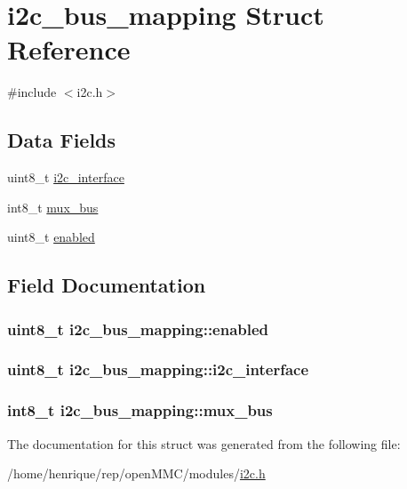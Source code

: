 \hypertarget{structi2c__bus__mapping}{\section{i2c\-\_\-bus\-\_\-mapping Struct Reference}
\label{structi2c__bus__mapping}
}


{\ttfamily \#include $<$i2c.\-h$>$}

\subsection*{Data Fields}
\begin{DoxyCompactItemize}
\item 
uint8\-\_\-t \hyperlink{structi2c__bus__mapping_ad1258325bf8a2f8cae58481ad77ed875}{i2c\-\_\-interface}
\item 
int8\-\_\-t \hyperlink{structi2c__bus__mapping_a91000fe9bd94bb2b6f5f4d75871f000e}{mux\-\_\-bus}
\item 
uint8\-\_\-t \hyperlink{structi2c__bus__mapping_a7b1cf1b2bd2f3ccacc8ad91a4c5a0f45}{enabled}
\end{DoxyCompactItemize}


\subsection{Field Documentation}
\hypertarget{structi2c__bus__mapping_a7b1cf1b2bd2f3ccacc8ad91a4c5a0f45}{
\subsubsection[{enabled}]{\setlength{\rightskip}{0pt plus 5cm}uint8\-\_\-t i2c\-\_\-bus\-\_\-mapping\-::enabled}}\label{structi2c__bus__mapping_a7b1cf1b2bd2f3ccacc8ad91a4c5a0f45}
\hypertarget{structi2c__bus__mapping_ad1258325bf8a2f8cae58481ad77ed875}{
\subsubsection[{i2c\-\_\-interface}]{\setlength{\rightskip}{0pt plus 5cm}uint8\-\_\-t i2c\-\_\-bus\-\_\-mapping\-::i2c\-\_\-interface}}\label{structi2c__bus__mapping_ad1258325bf8a2f8cae58481ad77ed875}
\hypertarget{structi2c__bus__mapping_a91000fe9bd94bb2b6f5f4d75871f000e}{
\subsubsection[{mux\-\_\-bus}]{\setlength{\rightskip}{0pt plus 5cm}int8\-\_\-t i2c\-\_\-bus\-\_\-mapping\-::mux\-\_\-bus}}\label{structi2c__bus__mapping_a91000fe9bd94bb2b6f5f4d75871f000e}


The documentation for this struct was generated from the following file\-:\begin{DoxyCompactItemize}
\item 
/home/henrique/rep/open\-M\-M\-C/modules/\hyperlink{i2c_8h}{i2c.\-h}\end{DoxyCompactItemize}
